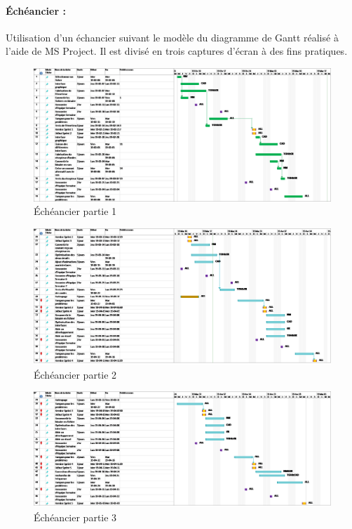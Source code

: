 \paragraph{Échéancier :}
Utilisation d'un échancier suivant le modèle du diagramme de Gantt réalisé à l'aide de MS Project. Il est divisé en trois captures d'écran à des fins pratiques.

\begin{figure}[ht!]
    \centering
    \caption{Échéancier partie 1}
    \includegraphics[width=0.8\linewidth]{images/echeancier/echeancier_sprint3_part1.png}
\end{figure}

\begin{figure}[ht!]
    \centering
    \caption{Échéancier partie 2}
    \includegraphics[width=0.8\linewidth]{images/echeancier/echeancier_sprint3_part2.png}
\end{figure}

\begin{figure}[ht!]
    \centering
    \caption{Échéancier partie 3}
    \includegraphics[width=0.8\linewidth]{images/echeancier/echeancier_sprint3_part3.png}
\end{figure}